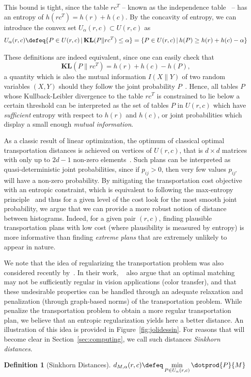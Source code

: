 \documentclass{amsart} %
\newtheorem{definition}{Definition}
\def\KL{\mathbf{KL}}
\begin{document}
This bound is tight, since the table $rc^T$ -- known as the independence table~\citep{good1963maximum} -- has an entropy of $h(rc^T)=h(r)+h(c)$. By the concavity of entropy, we can introduce the convex set $U_\alpha(r,c)\subset U(r,c)$ as
$$U_\alpha(r,c)\defeq \{P\in U(r,c)\,|\,\KL(P\|rc^T)\leq \alpha \} = \{P\in U(r,c)\,|\, h(P)\geq h(r)+h(c)-\alpha\}$$

These definitions are indeed equivalent, since one can easily check that 
$$\KL(P\|rc^T)= h(r)+h(c)-h(P),$$ a quantity which is also the mutual information $I(X\|Y)$ of two random variables $(X,Y)$ should they follow the joint probability $P$~\cite[\S2]{cover91elements}. Hence, all tables $P$ whose Kullback-Leibler divergence to the table $rc^T$ is constrained to lie below a certain threshold can be interpreted as the set of tables $P$ in $U(r,c)$ which have \emph{sufficient} entropy with respect to $h(r)$ and $h(c)$, or joint probabilities which display a small enough \emph{mutual information}.

As a classic result of linear optimization, the optimum of classical optimal transportation distances is achieved on vertices of $U(r,c)$, that is $d\times d$ matrices with only up to $2d-1$ non-zero elements~\citep[\S8.1.3]{brualdi2006combinatorial}. Such plans can be interpreted as quasi-deterministic joint probabilities, since if $p_{ij}>0$, then very few values $p_{ij'}$ will have a non-zero probability. By mitigating the transportation cost objective with an entropic constraint, which is equivalent to following the max-entropy principle~\citep{PhysRev.106.620,dudik2006maximum} and thus for a given level of the cost look for the most smooth joint probability, we argue that we can provide a more robust notion of distance between histograms. Indeed, for a given pair $(r,c)$, finding plausible transportation plans with low cost (where plausibility is measured by entropy) is more informative than finding \emph{extreme plans} that are extremely unlikely to appear in nature.

We note that the idea of regularizing the transportation problem was also considered recently by~\citet{ferradans2013regularized}. In their work, ~\citeauthor{ferradans2013regularized} also argue that an optimal matching may not be sufficiently regular in vision applications (color transfer), and that these undesirable properties can be handled through an adequate relaxation and penalization (through graph-based norms) of the transportation problem. While~\citet{ferradans2013regularized} penalize the transportation problem to obtain a more regular transportation plan, we believe that an entropic regularization yields here a better distance. An illustration of this idea is provided in Figure~\ref{fig:jolidessin}.  For reasons that will become clear in Section~\ref{sec:computing}, we call such distances \emph{Sinkhorn distances}.
\begin{definition}[Sinkhorn Distances]\label{def:sinkhorn} $\displaystyle d_{M,\alpha}(r,c)\defeq\min_{P\in U_\alpha(r,c)}\dotprod{P}{M}$
\end{definition}
\end{document}
